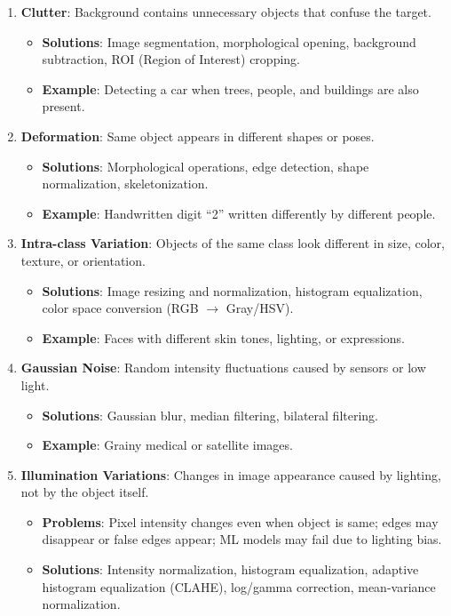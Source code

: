 \documentclass[11pt,a4paper]{article}
\begin{document}
\begin{enumerate}
    \item \textbf{Clutter}: Background contains unnecessary objects that confuse the target.
    \begin{itemize}
        \item \textbf{Solutions}: Image segmentation, morphological opening, background subtraction, ROI (Region of Interest) cropping.
        \item \textbf{Example}: Detecting a car when trees, people, and buildings are also present.
    \end{itemize}

    \item \textbf{Deformation}: Same object appears in different shapes or poses.
    \begin{itemize}
        \item \textbf{Solutions}: Morphological operations, edge detection, shape normalization, skeletonization.
        \item \textbf{Example}: Handwritten digit ``2'' written differently by different people.
    \end{itemize}

    \item \textbf{Intra-class Variation}: Objects of the same class look different in size, color, texture, or orientation.
    \begin{itemize}
        \item \textbf{Solutions}: Image resizing and normalization, histogram equalization, color space conversion (RGB $\to$ Gray/HSV).
        \item \textbf{Example}: Faces with different skin tones, lighting, or expressions.
    \end{itemize}

    \item \textbf{Gaussian Noise}: Random intensity fluctuations caused by sensors or low light.
    \begin{itemize}
        \item \textbf{Solutions}: Gaussian blur, median filtering, bilateral filtering.
        \item \textbf{Example}: Grainy medical or satellite images.
    \end{itemize}

    \item \textbf{Illumination Variations}: Changes in image appearance caused by lighting, not by the object itself.
    \begin{itemize}
        \item \textbf{Problems}: Pixel intensity changes even when object is same; edges may disappear or false edges appear; ML models may fail due to lighting bias.
        \item \textbf{Solutions}: Intensity normalization, histogram equalization, adaptive histogram equalization (CLAHE), log/gamma correction, mean-variance normalization.
    \end{itemize}
\end{enumerate}
\end{document}
